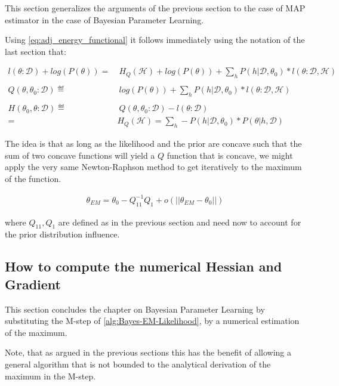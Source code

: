 \documentclass[11pt]{article}
\begin{document}
\begin{article}
This section generalizes the arguments of the previous section to
the case of MAP estimator in the case of Bayesian Parameter
Learning.

Using \ref{eq:adj_energy_functional} it follows immediately using the
notation of the last section that:

\begin{align} \label{eq:likelihood_energy_map_iterative}
l (\theta: \mathscr{D}) + log(P(\theta)) =& \ H_Q (\mathscr {H}) + log(P(\theta)) + \sum_h P(h | \mathscr{D}, \theta_0) * l (\theta: \mathscr{D}, \mathscr{H})\\
\nonumber\\
Q(\theta, \theta_0 : \mathscr{D}) \eqdef& \ log(P(\theta)) + \sum_h P(h | \mathscr{D}, \theta_0) * l (\theta: \mathscr{D}, \mathscr{H})\\
\nonumber\\  
H(\theta_0, \theta: \mathscr{D}) \eqdef& \ Q(\theta, \theta_0 : \mathscr{D}) - l (\theta: \mathscr{D}) \\
                                 =& H_Q (\mathscr {H}) = \sum_h - P(h | \mathscr{D}, \theta_0) * P(\theta | h, \mathscr{D}) \nonumber
\end{align}

The idea is that as long as the likelihood and the prior are
concave such that the sum of two concave functions will yield a \(Q\)
function that is concave, we might apply the very same
Newton-Raphson method to get iteratively to the maximum of the
function.

\begin{align} 
 \theta_{EM}  = \theta_{0} - Q_{11}^{-1} Q_1 + o(||\theta_{EM} - \theta_{0}||) \label{eq:em-iterative}
\end{align}

where \(Q_{11}, Q_1\) are defined as in the previous section and
need now to account for the prior distribution influence.



\subsection{How to compute the numerical Hessian and Gradient}
\label{sec:orgad84353}

This section concludes the chapter on Bayesian Parameter Learning
by substituting the M-step of \ref{alg:Bayes-EM-Likelihood}, by a
numerical estimation of the maximum.

Note, that as argued in the previous sections this has the benefit
of allowing a general algorithm that is not bounded to the
analytical derivation of the maximum in the M-step.


\end{article}
\end{document}

